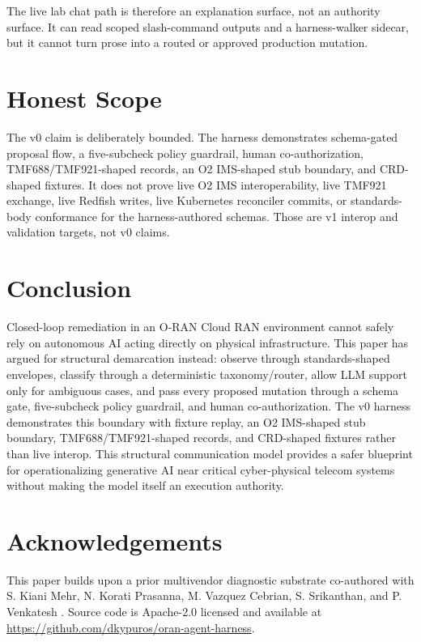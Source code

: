 \documentclass[twocolumn,10pt,a4paper]{article}
\begin{document}
The live lab chat path is therefore an explanation surface, not an authority surface. It can read scoped slash-command outputs and a harness-walker sidecar, but it cannot turn prose into a routed or approved production mutation.

\section{Honest Scope}
\label{sec:limits}

The v0 claim is deliberately bounded. The harness demonstrates schema-gated proposal flow, a five-subcheck policy guardrail, human co-authorization, TMF688/TMF921-shaped records, an O2 IMS-shaped stub boundary, and CRD-shaped fixtures. It does not prove live O2 IMS interoperability, live TMF921 exchange, live Redfish writes, live Kubernetes reconciler commits, or standards-body conformance for the harness-authored schemas. Those are v1 interop and validation targets, not v0 claims.

\section{Conclusion}
\label{sec:conclude}

Closed-loop remediation in an O-RAN Cloud RAN environment cannot safely rely on autonomous AI acting directly on physical infrastructure. This paper has argued for structural demarcation instead: observe through standards-shaped envelopes, classify through a deterministic taxonomy/router, allow LLM support only for ambiguous cases, and pass every proposed mutation through a schema gate, five-subcheck policy guardrail, and human co-authorization. The v0 harness demonstrates this boundary with fixture replay, an O2 IMS-shaped stub boundary, TMF688/TMF921-shaped records, and CRD-shaped fixtures rather than live interop. This structural communication model provides a safer blueprint for operationalizing generative AI near critical cyber-physical telecom systems without making the model itself an execution authority.

\section*{Acknowledgements}

This paper builds upon a prior multivendor diagnostic substrate co-authored with S. Kiani Mehr, N. Korati Prasanna, M. Vazquez Cebrian, S. Srikanthan, and P. Venkatesh \cite{multivendor_blog_2026}. Source code is Apache-2.0 licensed and available at \url{https://github.com/dkypuros/oran-agent-harness}.



\end{document}
